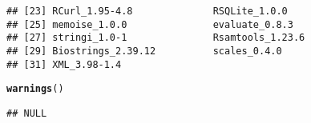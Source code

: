 \documentclass[11pt]{article}\usepackage[]{graphicx}\usepackage[]{color}
\makeatletter
\newcommand{\hlstd}[1]{\textcolor[rgb]{0.345,0.345,0.345}{#1}}%
\newcommand{\hlkwd}[1]{\textcolor[rgb]{0.737,0.353,0.396}{\textbf{#1}}}%
\newenvironment{kframe}{%
 \def\at@end@of@kframe{}%
 \ifinner\ifhmode%
  \def\at@end@of@kframe{\end{minipage}}%
  \begin{minipage}{\columnwidth}%
 \fi\fi%
 \def\FrameCommand##1{\hskip\@totalleftmargin \hskip-\fboxsep
 \colorbox{shadecolor}{##1}\hskip-\fboxsep
     \hskip-\linewidth \hskip-\@totalleftmargin \hskip\columnwidth}%
 \MakeFramed {\advance\hsize-\width
   \@totalleftmargin\z@ \linewidth\hsize
   \@setminipage}}%
 {\par\unskip\endMakeFramed%
 \at@end@of@kframe}
\newenvironment{knitrout}{}{} %
\makeatother
\begin{document}
\begin{scriptsize}
\begin{knitrout}
\begin{kframe}
\begin{verbatim}
## [23] RCurl_1.95-4.8              RSQLite_1.0.0              
## [25] memoise_1.0.0               evaluate_0.8.3             
## [27] stringi_1.0-1               Rsamtools_1.23.6           
## [29] Biostrings_2.39.12          scales_0.4.0               
## [31] XML_3.98-1.4
\end{verbatim}
\begin{alltt}
\hlkwd{warnings}\hlstd{()}
\end{alltt}
\begin{verbatim}
## NULL
\end{verbatim}
\end{kframe}
\end{knitrout}
\end{scriptsize}
\end{document}
